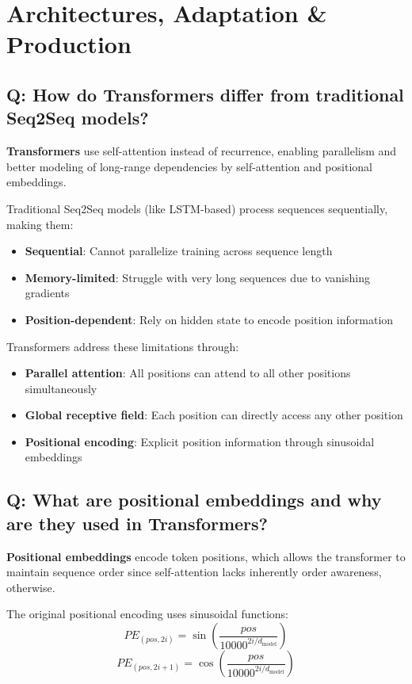 \section{Architectures, Adaptation \& Production}

\subsection*{Q: How do Transformers differ from traditional Seq2Seq models?}
\textbf{Transformers} use self-attention instead of recurrence, enabling parallelism and better modeling of long-range dependencies by self-attention and positional embeddings.

Traditional Seq2Seq models (like LSTM-based) process sequences sequentially, making them:
\begin{itemize}
	\item \textbf{Sequential}: Cannot parallelize training across sequence length
	\item \textbf{Memory-limited}: Struggle with very long sequences due to vanishing gradients
	\item \textbf{Position-dependent}: Rely on hidden state to encode position information
\end{itemize}

Transformers address these limitations through:
\begin{itemize}
	\item \textbf{Parallel attention}: All positions can attend to all other positions simultaneously
	\item \textbf{Global receptive field}: Each position can directly access any other position
	\item \textbf{Positional encoding}: Explicit position information through sinusoidal embeddings
\end{itemize}

\subsection*{Q: What are positional embeddings and why are they used in Transformers?}
\textbf{Positional embeddings} encode token positions, which allows the transformer to maintain sequence order since self-attention lacks inherently order awareness, otherwise.

The original positional encoding uses sinusoidal functions:
\[
	PE_{(pos, 2i)} = \sin\left(\frac{pos}{10000^{2i/d_{\text{model}}}}\right)
\]
\[
	PE_{(pos, 2i+1)} = \cos\left(\frac{pos}{10000^{2i/d_{\text{model}}}}\right)
\]

